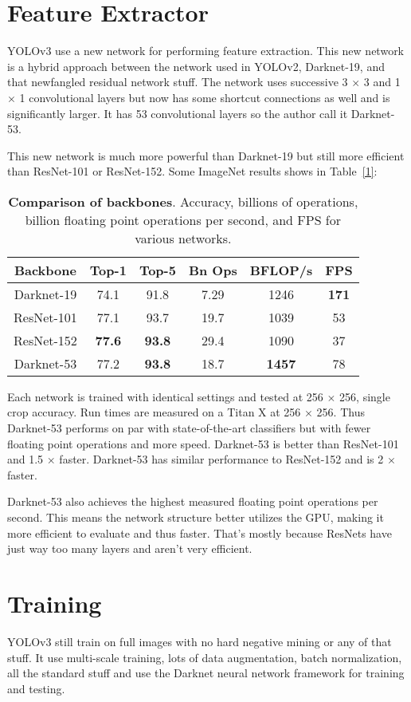 \documentclass[10pt,twocolumn,letterpaper]{article}
\begin{document}
\section{Feature Extractor}
YOLOv3 use a new network for performing feature extraction. This new network is a hybrid approach between the network used in YOLOv2, Darknet-19, and that newfangled residual network stuff. The network uses successive 3 $\times$ 3 and 1 $\times$ 1 convolutional layers but now has some shortcut connections as well and is significantly larger. It has 53 convolutional
layers so the author call it Darknet-53.
\par 
This new network is much more powerful than Darknet-19 but still more efficient than ResNet-101 or ResNet-152. Some ImageNet results shows in Table~\ref{1}:
\begin{table}
	\small
	\renewcommand\arraystretch{1.2}
	\centering
\begin{tabular}{c|c|c|c|c|c}

	Backbone & Top-1 & Top-5 & Bn Ops & BFLOP/s & FPS \\
	\hline
	Darknet-19 \cite{Redmon2017YOLO9000} & 74.1 & 91.8 & 7.29 & 1246 & \textbf{171} \\

	ResNet-101 \cite{He2015Deep} & 77.1 & 93.7 & 19.7 & 1039 & 53 \\

	ResNet-152 \cite{He2015Deep} & \textbf{77.6} & \textbf{93.8} & 29.4 & 1090 & 37 \\

	Darknet-53 & 77.2 & \textbf{93.8} & 18.7 & \textbf{1457} & 78 \\

\end{tabular} 
\caption{\textbf{Comparison of backbones}. Accuracy, billions of operations, billion floating point operations per second, and FPS for various networks.}
\label{tab1}
\end{table}
\par
Each network is trained with identical settings and tested at 256 $\times$ 256, single crop accuracy. Run times are measured on a Titan X at 256 $\times$ 256. Thus Darknet-53 performs on par with state-of-the-art classifiers but with fewer floating point operations and more speed. Darknet-53 is better than ResNet-101 and 1.5 $\times$ faster. Darknet-53 has similar performance to ResNet-152 and is 2 $\times$ faster.
\par
Darknet-53 also achieves the highest measured floating point operations per second. This means the network structure better utilizes the GPU, making it more efficient to evaluate and thus faster. That's mostly because ResNets have just way too many layers and aren't very efficient.
\section{Training}
YOLOv3 still train on full images with no hard negative mining or any of that stuff. It use multi-scale training, lots of data
augmentation, batch normalization, all the standard stuff and use the Darknet neural network framework for training and testing.
{\small
	


}
\end{document}
